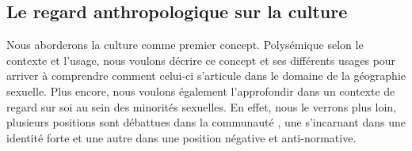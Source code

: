 \subsection{Le regard anthropologique sur la culture}
\label{subsec:le_regard_anthropologique_sur_la_culture}
Nous aborderons la culture comme premier concept.
Polysémique selon le contexte et l'usage, nous voulons décrire ce concept et ses différents usages pour arriver à comprendre comment celui-ci s'articule dans le domaine de la géographie sexuelle.
Plus encore, nous voulons également l'approfondir dans un contexte de regard sur soi au sein des minorités sexuelles.
En effet, nous le verrons plus loin, plusieurs positions sont débattues dans la communauté \lgbt{}, une s'incarnant dans une identité forte et une autre dans une position négative et anti-normative.



